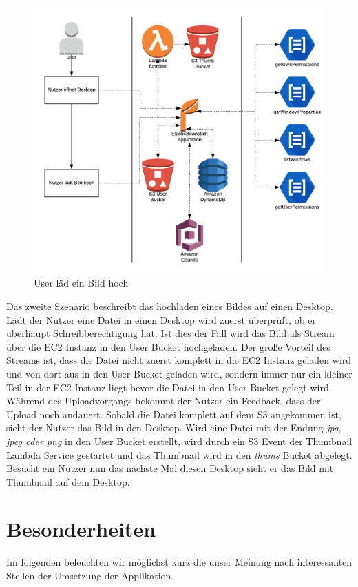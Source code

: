 \documentclass[a4paper, 12pt]{scrreprt}
\renewcommand\_{\textunderscore\allowbreak}
\begin{document}
\begin{figure}[h]
\centering
\includegraphics[scale=0.6]{Flow-Dia-12.png}
\caption{User läd ein Bild hoch}
\end{figure}

Das zweite Szenario beschreibt das hochladen eines Bildes auf einen Desktop. Lädt der Nutzer eine Datei in einen Desktop wird zuerst überprüft, ob er überhaupt Schreibberechtigung hat. Ist dies der Fall wird das Bild als Stream über die EC2 Instanz in den User Bucket hochgeladen. Der große Vorteil des Streams ist, dass die Datei nicht zuerst komplett in die EC2 Instanz geladen wird und von dort aus in den User Bucket geladen wird, sondern immer nur ein kleiner Teil in der EC2 Instanz liegt bevor die Datei in den User Bucket gelegt wird. Während des Uploadvorgangs bekommt der Nutzer ein Feedback, dass der Upload noch andauert. Sobald die Datei komplett auf dem S3 angekommen ist, sieht der Nutzer das Bild in den Desktop. Wird eine Datei mit der Endung \textit{jpg, jpeg oder png} in den User Bucket erstellt, wird durch ein S3 Event der Thumbnail Lambda Service gestartet und das Thumbnail wird in den \textit{thums} Bucket abgelegt. Besucht ein Nutzer nun das nächste Mal diesen Desktop sieht er das Bild mit Thumbnail auf dem Desktop.



\chapter{Besonderheiten}
Im folgenden beleuchten wir möglichst kurz die unser Meinung nach interessanten Stellen der Umsetzung der Applikation.
\end{document}
